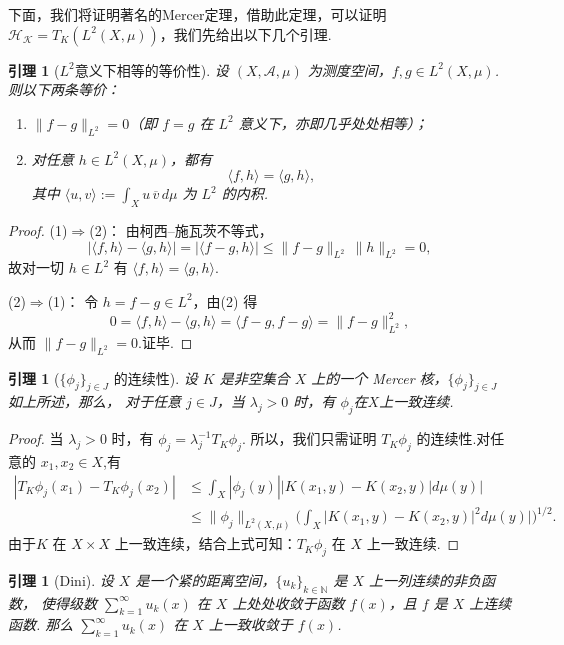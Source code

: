 \documentclass[12pt, a4paper, oneside]{ctexbook}
\newtheorem{lemma}[theorem]{引理}
\begin{document}
下面，我们将证明著名的Mercer定理，借助此定理，可以证明$\mathcal{H_K}= T_K\left(L^2(X,\mu)\right)$，我们先给出以下几个引理.
\begin{lemma}[$L^2$意义下相等的等价性]\label{lemma: L2中等价性}
    设 $(X,\mathcal{A},\mu)$ 为测度空间，$f,g\in L^2(X,\mu)$.则以下两条等价：
\begin{enumerate}
    \item $\|f-g\|_{L^2}=0$（即 $f=g$ 在 $L^2$ 意义下，亦即几乎处处相等）；
    \item 对任意 $h\in L^2(X,\mu)$，都有
    \[
        \langle f,h\rangle=\langle g,h\rangle,
    \]
    其中 $\langle u,v\rangle:=\int_X u\,\overline{v}\,d\mu$ 为 $L^2$ 的内积.
\end{enumerate}

\end{lemma}
\begin{proof}
(1)$\Rightarrow$(2)：
由柯西–施瓦茨不等式，
\[
\big|\langle f,h\rangle-\langle g,h\rangle\big|
=\big|\langle f-g,h\rangle\big|
\le \|f-g\|_{L^2}\,\|h\|_{L^2}=0,
\]
故对一切 $h\in L^2$ 有 $\langle f,h\rangle=\langle g,h\rangle$.

(2)$\Rightarrow$(1)：
令 $h=f-g\in L^2$，由(2) 得
\[
0=\langle f,h\rangle-\langle g,h\rangle
=\langle f-g,f-g\rangle
=\|f-g\|_{L^2}^2,
\]
从而 $\|f-g\|_{L^2}=0$.证毕.
\end{proof}


\begin{lemma}[{\(\{\phi_j\}_{j\in J}\) 的连续性}]\label{lemma: phi_j连续性}
设 $K$ 是非空集合 $X$ 上的一个 Mercer 核，$\{\phi_j\}_{j\in J}$ 如上所述，那么，
对于任意 $j\in J$，当 $\lambda_j>0$ 时，有 $\phi_j$在$X$上一致连续.
\end{lemma}

\begin{proof}
    当  $\lambda _{j}> 0$ 时，有 $\phi_j=\lambda_j^{-1}T_{K}\phi_{j}.$ 所以，我们只需证明 $T_K\phi_{j}$ 的连续性.对任意的 $x_1,x_2\in X$,有
$$\begin{aligned}|T_{K}\phi_{j}(x_{1})-T_{K}\phi_{j}(x_{2})|&\leq\int_{X}|\phi_{j}(y)||K(x_{1},y)-K(x_{2},y)|d\mu(y)|\\&\leq\|\phi_j\|_{L^2(X,\mu)}\Big(\int_X|K(x_1,y)-K(x_2,y)|^2d\mu(y)|\Big)^{1/2}.\end{aligned}$$
由于$K$ 在 $X\times X$ 上一致连续，结合上式可知：$T_K\phi_j$ 在 $X$ 上一致连续.
\end{proof}

\begin{lemma}[Dini]\label{lemma:Dini}
设 $X$ 是一个紧的距离空间，$\{u_k\}_{k\in\mathbb{N}}$ 是 $X$ 上一列连续的非负函数，
使得级数 $\sum_{k=1}^\infty u_k(x)$ 在 $X$ 上处处收敛于函数 $f(x)$，且 $f$ 是 $X$ 上连续函数.
那么 $\sum_{k=1}^\infty u_k(x)$ 在 $X$ 上一致收敛于 $f(x)$.
\end{lemma}
\end{document}
